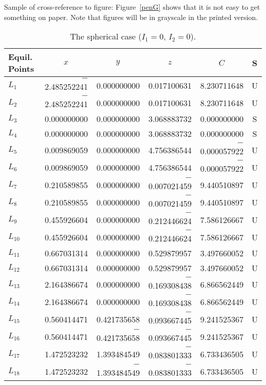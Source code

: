 \documentclass[ecta,nameyear,final,supplement]{econsocart}
\theoremstyle{plain}
\theoremstyle{definition}
\begin{document}
Sample of cross-reference to figure: Figure~\ref{penG} shows that it is not easy to get something on paper. Note that figures will be in grayscale in the printed version.
\begin{table*}
\caption{The spherical case ($I_1=0$, $I_2=0$).}
\label{sphericcase}
\begin{tabular}{@{}lrrrrc@{}@{}}
\hline
Equil. Points
& \multicolumn{1}{c}{$x$}
& \multicolumn{1}{c}{$y$}
& \multicolumn{1}{c}{$z$}
& \multicolumn{1}{c}{$C$}
& S \\
\hline
$L_1$    & $-$2.485252241 & 0.000000000    & 0.017100631    & 8.230711648    & U \\
$L_2$    & $-$2.485252241 & 0.000000000    & 0.017100631    & 8.230711648    & U \\
$L_3$    & 0.000000000    & 0.000000000    & 3.068883732    & 0.000000000    & S \\
$L_4$    & 0.000000000    & 0.000000000    & 3.068883732    & 0.000000000    & S \\
$L_5$    & 0.009869059    & 0.000000000    & 4.756386544    & $-$0.000057922 & U \\
$L_6$    & 0.009869059    & 0.000000000    & 4.756386544    & $-$0.000057922 & U \\
$L_7$    & 0.210589855    & 0.000000000    & $-$0.007021459 & 9.440510897    & U \\
$L_8$    & 0.210589855    & 0.000000000    & $-$0.007021459 & 9.440510897    & U \\
$L_9$    & 0.455926604    & 0.000000000    & $-$0.212446624 & 7.586126667    & U \\
$L_{10}$    & 0.455926604    & 0.000000000    & $-$0.212446624 & 7.586126667    & U \\
$L_{11}$    & 0.667031314    & 0.000000000    & 0.529879957    & 3.497660052    & U \\
$L_{12}$    & 0.667031314    & 0.000000000    & 0.529879957    & 3.497660052    & U \\
$L_{13}$    & 2.164386674    & 0.000000000    & $-$0.169308438 & 6.866562449    & U \\
$L_{14}$    & 2.164386674    & 0.000000000    & $-$0.169308438 & 6.866562449    & U \\
$L_{15}$    & 0.560414471    & 0.421735658    & $-$0.093667445 & 9.241525367    & U \\
$L_{16}$    & 0.560414471    & $-$0.421735658 & $-$0.093667445 & 9.241525367    & U \\
$L_{17}$ & 1.472523232    & 1.393484549    & $-$0.083801333 & 6.733436505    & U \\
$L_{18}$ & 1.472523232    & $-$1.393484549 & $-$0.083801333 & 6.733436505    & U \\
\hline
\end{tabular}

\end{table*}
\end{document}
